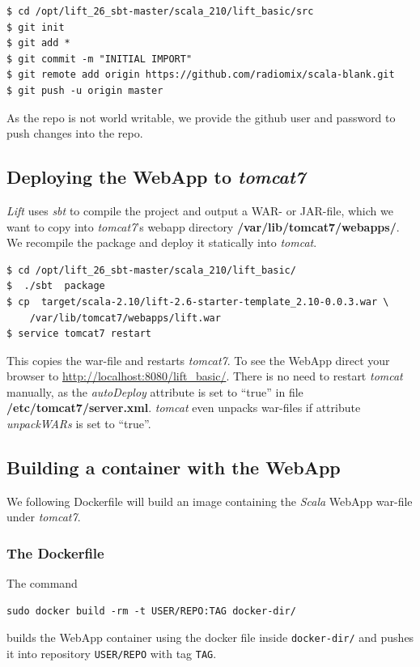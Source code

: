 \documentclass[captions=tableheading]{article}
\begin{document}
\begin{verbatim}
$ cd /opt/lift_26_sbt-master/scala_210/lift_basic/src
$ git init
$ git add *
$ git commit -m "INITIAL IMPORT"
$ git remote add origin https://github.com/radiomix/scala-blank.git
$ git push -u origin master
\end{verbatim}
As the repo is not world writable, we provide the github user and password to push changes into the repo.
\subsection{Deploying the WebApp to \emph{tomcat7}}
\label{sec-4-4}

\emph{Lift} uses \emph{sbt} to compile the project and output a WAR- or JAR-file, which we want to copy into \emph{tomcat7}'s webapp directory \textbf{/var/lib/tomcat7/webapps/}. We recompile the package and deploy it statically into \emph{tomcat}.

\begin{verbatim}
$ cd /opt/lift_26_sbt-master/scala_210/lift_basic/
$  ./sbt  package
$ cp  target/scala-2.10/lift-2.6-starter-template_2.10-0.0.3.war \
    /var/lib/tomcat7/webapps/lift.war
$ service tomcat7 restart
\end{verbatim}
This copies the war-file and restarts \emph{tomcat7}. To see the WebApp direct your browser to \href{http://localhost:8080/lift_basic/}{http://localhost:8080/lift\_basic/}. There is no need to restart \emph{tomcat} manually, as the \emph{autoDeploy} attribute is set to ``true'' in file \textbf{/etc/tomcat7/server.xml}. \emph{tomcat} even unpacks war-files if attribute \emph{unpackWARs} is set to ``true''.
\subsection{Building a container with the WebApp}
\label{sec-4-5}

We following Dockerfile will build an image containing the \emph{Scala} WebApp war-file under \emph{tomcat7}.
\subsubsection{The Dockerfile}
\label{sec-4-5-1}

The command 

\begin{verbatim}
sudo docker build -rm -t USER/REPO:TAG docker-dir/
\end{verbatim}
builds the WebApp container using the docker file inside \texttt{docker-dir/} and pushes it into repository \texttt{USER/REPO} with tag \texttt{TAG}. 
\end{document}
